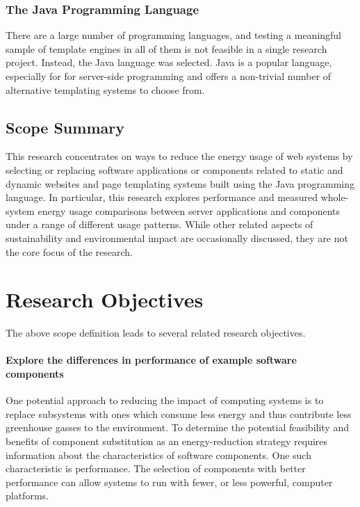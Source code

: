 \subsubsection{The Java Programming Language}

There are a large number of programming languages, and testing a meaningful sample of template engines in all of them is not feasible in a single research project. Instead, the Java language was selected. Java is a popular language, especially for for server-side programming \citep{Tiobe2018} and offers a non-trivial number of alternative templating systems to choose from.

\subsection{Scope Summary}
\label{scope:summary}

This research concentrates on ways to reduce the energy usage of web systems by selecting or replacing software applications or components related to static and dynamic websites and page templating systems built using the Java programming language. In particular, this research explores performance and measured whole-system energy usage comparisons between server applications and components under a range of different usage patterns. While other related aspects of sustainability and environmental impact are occasionally discussed, they are not the core focus of the research.

\section{Research Objectives}
\label{section:research objectives}

The above scope definition leads to several related research objectives.

\paragraph{Explore the differences in performance of example software components}

One potential approach to reducing the impact of computing systems is to replace subsystems with ones which consume less energy and thus contribute less greenhouse gasses to the environment. To determine the potential feasibility and benefits of component substitution as an energy-reduction strategy requires information about the characteristics of software components. One such characteristic is performance. The selection of components with better performance can allow systems to run with fewer, or less powerful, computer platforms.

